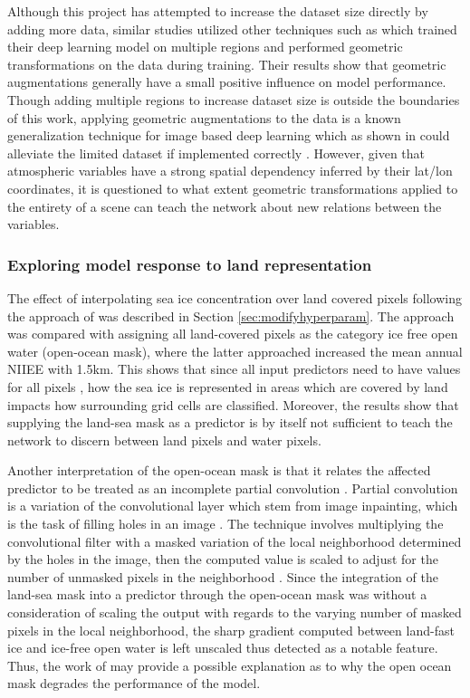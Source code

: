 \documentclass[../main/thesis]{subfiles}
\begin{document}
Although this project has attempted to increase the dataset size directly by adding more data, similar studies utilized other techniques such as \citet{Grigoryev2022} which trained their deep learning model on multiple regions and performed geometric transformations on the data during training. Their results show that geometric augmentations generally have a small positive influence on model performance. Though adding multiple regions to increase dataset size is outside the boundaries of this work, applying geometric augmentations to the data is a known generalization technique for image based deep learning which as shown in \citet{Grigoryev2022} could alleviate the limited dataset if implemented correctly \citep{Shorten2019}. However, given that atmospheric variables have a strong spatial dependency inferred by their lat/lon coordinates, it is questioned to what extent geometric transformations applied to the entirety of a scene can teach the network about new relations between the variables.

\subsubsection{Exploring model response to land representation}
\label{sec:tuning_model}
The effect of interpolating sea ice concentration over land covered pixels following the approach of \citet{Wang2017} was described in Section \ref{sec:modifyhyperparam}. The approach was compared with assigning all land-covered pixels as the category ice free open water (open-ocean mask), where the latter approached increased the mean annual NIIEE with 1.5km. This shows that since all input predictors need to have values for all pixels \citep{Ronneberger2015}, how the sea ice is represented in areas which are covered by land impacts how surrounding grid cells are classified. Moreover, the results show that supplying the land-sea mask as a predictor is by itself not sufficient to teach the network to discern between land pixels and water pixels.

Another interpretation of the open-ocean mask is that it relates the affected predictor to be treated as an incomplete partial convolution \citep{Liu2018}. Partial convolution is a variation of the convolutional layer which stem from image inpainting, which is the task of filling holes in an image \citep{Liu2018}. The technique involves multiplying the convolutional filter with a masked variation of the local neighborhood determined by the holes in the image, then the computed value is scaled to adjust for the number of unmasked pixels in the neighborhood \citep{Liu2018}. Since the integration of the land-sea mask into a predictor through the open-ocean mask was without a consideration of scaling the output with regards to the varying number of masked pixels in the local neighborhood, the sharp gradient computed between land-fast ice and ice-free open water is left unscaled thus detected as a notable feature. Thus, the work of \citet{Liu2018} may provide a possible explanation as to why the open ocean mask degrades the performance of the model. 
\end{document}
